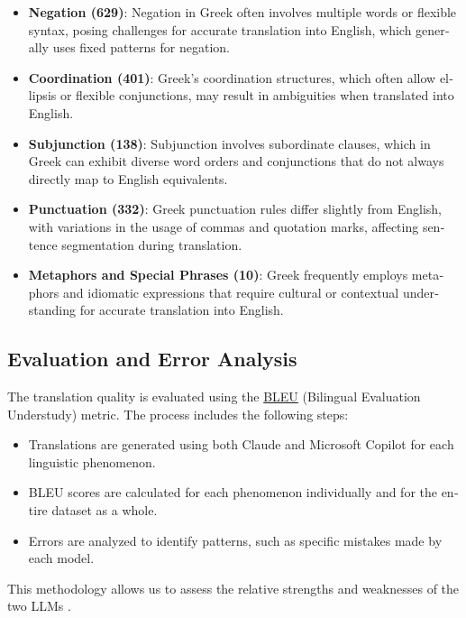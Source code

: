 \documentclass[twocolumn]{article}
\newcommand{\en}[1]{\foreignlanguage{english}{#1}}
\begin{document}
\begin{itemize}
    \item \textbf{\en{Negation (629)}}:  
    \en{Negation in Greek often involves multiple words or flexible syntax, posing challenges for accurate translation into English, which generally uses fixed patterns for negation.}

    \item \textbf{\en{Coordination (401)}}:  
    \en{Greek's coordination structures, which often allow ellipsis or flexible conjunctions, may result in ambiguities when translated into English.}

    \item \textbf{\en{Subjunction (138)}}:  
    \en{Subjunction involves subordinate clauses, which in Greek can exhibit diverse word orders and conjunctions that do not always directly map to English equivalents.}

    \item \textbf{\en{Punctuation} (332)}:  
    \en{Greek punctuation rules differ slightly from English, with variations in the usage of commas and quotation marks, affecting sentence segmentation during translation.}

    \item \textbf{\en{Metaphors and Special Phrases (10)}}:  
    \en{Greek frequently employs metaphors and idiomatic expressions that require cultural or contextual understanding for accurate translation into English.}
\end{itemize}

\subsection{\en{Evaluation and Error Analysis}}
\en{The translation quality is evaluated using the \href{https://translate.tilde.ai/bleu#/}{BLEU} (Bilingual Evaluation Understudy) metric. The process includes the following steps:}
\begin{itemize}
    \item \en{Translations are generated using both Claude and Microsoft Copilot for each linguistic phenomenon.}
    \item \en{BLEU scores are calculated for each phenomenon individually and for the entire dataset as a whole.}
    \item \en{Errors are analyzed to identify patterns, such as specific mistakes made by each model.}
\end{itemize}

\en{This methodology allows us to assess the relative strengths and weaknesses of the two LLMs .}
\end{document}
